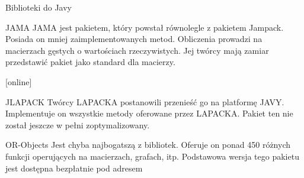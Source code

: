 	\begin{frame}[allowframebreaks]{Biblioteki do Javy}
		\begin{block}{JAMA}
			JAMA jest pakietem, który powstał równolegle z pakietem Jampack. Posiada on mniej zaimplementowanych metod. Obliczenia prowadzi na macierzach gęstych o wartościach rzeczywistych. Jej twórcy mają zamiar przedstawić pakiet jako standard dla macierzy. 
			\begin{thebibliography}{9}
				[online]
			\end{thebibliography}
		\end{block}
		\begin{block}{JLAPACK}
			Twórcy LAPACKA postanowili przenieść go na platformę JAVY. Implementuje on wszystkie metody oferowane przez LAPACKA. Pakiet ten nie został jeszcze w pełni zoptymalizowany. 
		\end{block}
		\begin{block}{OR-Objects}
			Jest chyba najbogatszą z bibliotek. Oferuje on ponad 450 różnych funkcji operujących na macierzach, grafach, itp. Podstawowa wersja tego pakietu jest dostępna bezpłatnie pod adresem
		\end{block}
	\end{frame}